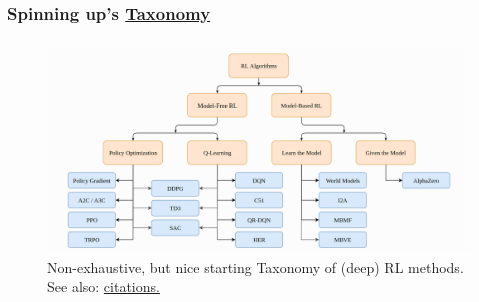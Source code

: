 \documentclass{beamer}
\begin{document}
\begin{frame}
  \frametitle{Spinning up's \href{https://spinningup.openai.com/en/latest/spinningup/rl_intro2.html}{Taxonomy}}
  \begin{figure}
    \label{fig:deep-rl-taxonomy}
    \includegraphics[width=\textwidth]{../images/spinup_rl_taxonomy.png}
    \caption{Non-exhaustive, but nice starting Taxonomy of (deep) RL methods. See also:
      \href{https://spinningup.openai.com/en/latest/spinningup/rl_intro2.html\#citations-below}{citations.}}
  \end{figure}
\end{frame}
\end{document}
